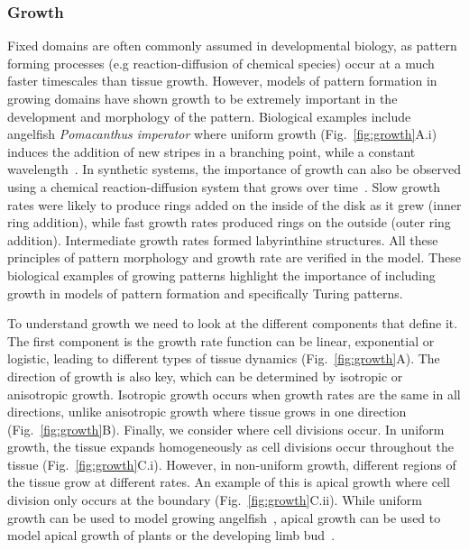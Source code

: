  \subsubsection{Growth}\label{growth_intro}
Fixed domains are often commonly assumed in developmental biology, as pattern forming processes (e.g reaction-diffusion of chemical species) occur at a much faster timescales than tissue growth. %
However, models of pattern formation in growing domains have shown growth to be extremely important in the development and morphology of the pattern.
Biological examples include angelﬁsh \textit{Pomacanthus imperator} where uniform growth (Fig.~\ref{fig:growth}A.i) induces the addition of new stripes in a branching point, while a constant wavelength~\parencite{Kondo1995}.
In synthetic systems, the importance of growth can also be observed using a chemical reaction-diffusion system that grows over time~\parencite{Konow2019}.
Slow growth rates were likely to produce rings added on the inside of the disk as it grew (inner ring addition), while fast growth rates produced rings on the outside (outer ring addition).
Intermediate growth rates formed labyrinthine structures.
All these principles of pattern morphology and growth rate are verified in the model.
These biological examples of growing patterns highlight the importance of including growth in models of pattern formation and specifically Turing patterns.

To understand growth we need to look at the different components that define it.
The first component is the growth rate function can be linear, exponential or logistic, leading to different types of tissue dynamics (Fig.~\ref{fig:growth}A).
The direction of growth is also key, which can be determined by isotropic or anisotropic growth.
Isotropic growth occurs when growth rates are the same in all directions, unlike anisotropic growth where tissue grows in one direction (Fig.~\ref{fig:growth}B).
Finally, we consider where cell divisions occur.
In uniform growth, the tissue expands homogeneously as cell divisions occur throughout the tissue (Fig.~\ref{fig:growth}C.i).
However, in non-uniform growth, different regions of the tissue grow at different rates.
An example of this is apical growth where cell division only occurs at the boundary (Fig.~\ref{fig:growth}C.ii).
While uniform growth can be used to model growing angelfish~\parencite{Kondo1995}, apical growth can be used to model apical growth of plants or the developing limb bud~\parencite{crampin2002pattern}.



